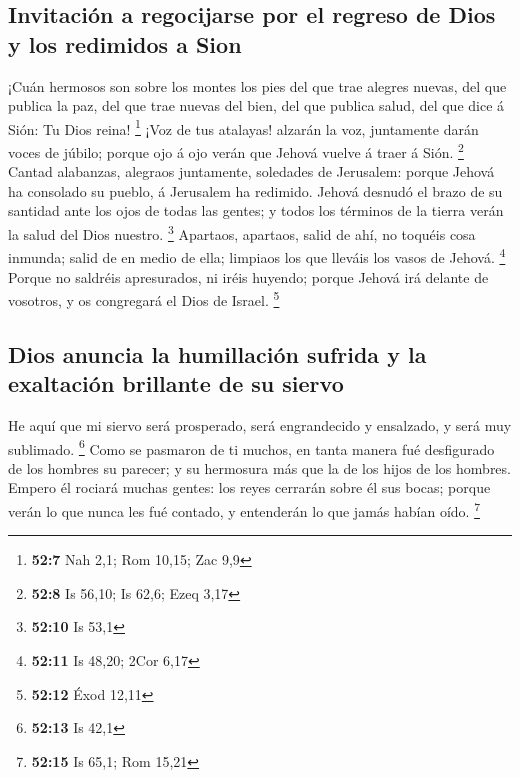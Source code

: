 \hypertarget{invitaciuxf3n-a-regocijarse-por-el-regreso-de-dios-y-los-redimidos-a-sion}{%
\subsection{Invitación a regocijarse por el regreso de Dios y los
redimidos a
Sion}\label{invitaciuxf3n-a-regocijarse-por-el-regreso-de-dios-y-los-redimidos-a-sion}}

 ¡Cuán hermosos son sobre los montes los pies del que trae
alegres nuevas, del que publica la paz, del que trae nuevas del bien,
del que publica salud, del que dice á Sión: Tu Dios reina! \footnote{\textbf{52:7}
  Nah 2,1; Rom 10,15; Zac 9,9}  ¡Voz de tus atalayas!
alzarán la voz, juntamente darán voces de júbilo; porque ojo á ojo verán
que Jehová vuelve á traer á Sión. \footnote{\textbf{52:8} Is 56,10; Is
  62,6; Ezeq 3,17}  Cantad alabanzas, alegraos juntamente,
soledades de Jerusalem: porque Jehová ha consolado su pueblo, á
Jerusalem ha redimido.  Jehová desnudó el brazo de su
santidad ante los ojos de todas las gentes; y todos los términos de la
tierra verán la salud del Dios nuestro. \footnote{\textbf{52:10} Is 53,1}
 Apartaos, apartaos, salid de ahí, no toquéis cosa inmunda;
salid de en medio de ella; limpiaos los que lleváis los vasos de Jehová.
\footnote{\textbf{52:11} Is 48,20; 2Cor 6,17}  Porque no
saldréis apresurados, ni iréis huyendo; porque Jehová irá delante de
vosotros, y os congregará el Dios de Israel. \footnote{\textbf{52:12}
  Éxod 12,11}

\hypertarget{dios-anuncia-la-humillaciuxf3n-sufrida-y-la-exaltaciuxf3n-brillante-de-su-siervo}{%
\subsection{Dios anuncia la humillación sufrida y la exaltación
brillante de su
siervo}\label{dios-anuncia-la-humillaciuxf3n-sufrida-y-la-exaltaciuxf3n-brillante-de-su-siervo}}

 He aquí que mi siervo será prosperado, será engrandecido y
ensalzado, y será muy sublimado. \footnote{\textbf{52:13} Is 42,1}
 Como se pasmaron de ti muchos, en tanta manera fué
desfigurado de los hombres su parecer; y su hermosura más que la de los
hijos de los hombres.  Empero él rociará muchas gentes: los
reyes cerrarán sobre él sus bocas; porque verán lo que nunca les fué
contado, y entenderán lo que jamás habían oído. \footnote{\textbf{52:15}
  Is 65,1; Rom 15,21}

